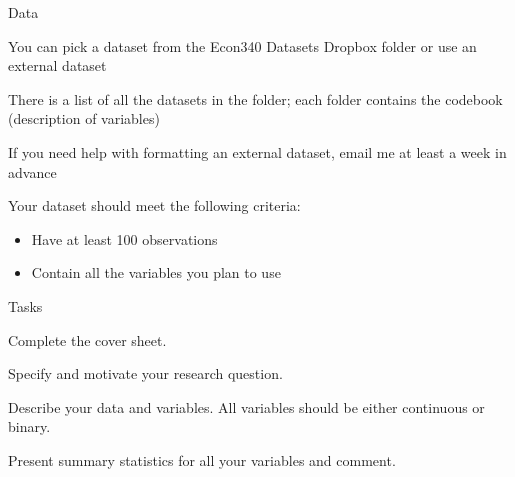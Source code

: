 \documentclass{./../Lectures/div_teaching_slides}
\begin{document}
\begin{frame}{Data}
\begin{witemize}
  \item You can pick a dataset from the Econ340 Datasets Dropbox folder or use an external dataset
  \item There is a list of all the datasets in the folder; each folder contains the codebook (description of variables)
  \item  If you need help with formatting an external dataset, email me at least a week in advance
  \item Your dataset should meet the following criteria:\\
  \begin{itemize}
  \item Have at least 100 observations
  \item Contain all the variables you plan to use
  \end{itemize}
\end{witemize}
\end{frame}


\begin{frame}{Tasks}
\begin{wenumerate}
  \item Complete the cover sheet.
  \item Specify and motivate your research question.
  \item Describe your data and variables. All variables should be either continuous or binary.
  \item Present summary statistics for all your variables and comment.
\end{wenumerate}
\end{frame}
\end{document}
